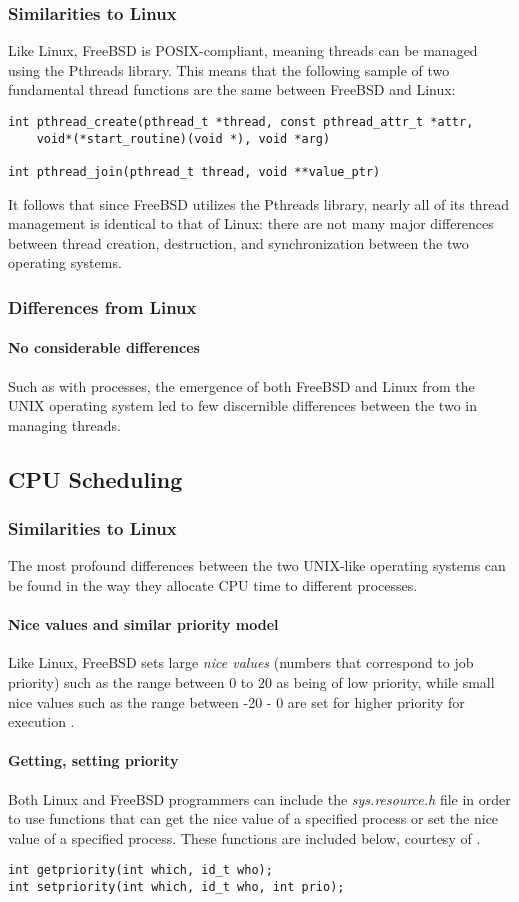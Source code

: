 \documentclass[letterpaper,10pt,titlepage]{article}
\begin{document}
\subsubsection{Similarities to Linux}
Like Linux, FreeBSD is POSIX-compliant, meaning threads can be managed using the Pthreads library. This means that the following sample of two fundamental thread functions are the same between FreeBSD and Linux:
\begin{lstlisting}
int pthread_create(pthread_t *thread, const pthread_attr_t *attr, 
	void*(*start_routine)(void *), void *arg)

int pthread_join(pthread_t thread, void **value_ptr)
\end{lstlisting}
It follows that since FreeBSD utilizes the Pthreads library, nearly all of its thread management is identical to that of Linux: there are not many major differences between thread creation, destruction, and synchronization between the two operating systems.
\subsubsection{Differences from Linux}
\paragraph{No considerable differences} Such as with processes, the emergence of both FreeBSD and Linux from the UNIX operating system led to few discernible differences between the two in managing threads. 
\subsection{CPU Scheduling}
\subsubsection{Similarities to Linux}
The most profound differences between the two UNIX-like operating systems can be found in the way they allocate CPU time to different processes. 
\paragraph{Nice values and similar priority model} Like Linux, FreeBSD sets large \emph{nice values} (numbers that correspond to job priority) such as the range between 0 to 20 as being of low priority, while small nice values such as the range between -20 - 0 are set for higher priority for execution \cite{boe01}. 
\paragraph{Getting, setting priority} Both Linux and FreeBSD programmers can include the \emph{sys.resource.h} file in order to use functions that can get the nice value of a specified process or set the nice value of a specified process. These functions are included below, courtesy of \cite{ker10}. 
\begin{lstlisting}
int getpriority(int which, id_t who);
int setpriority(int which, id_t who, int prio);
\end{lstlisting}
\end{document}

